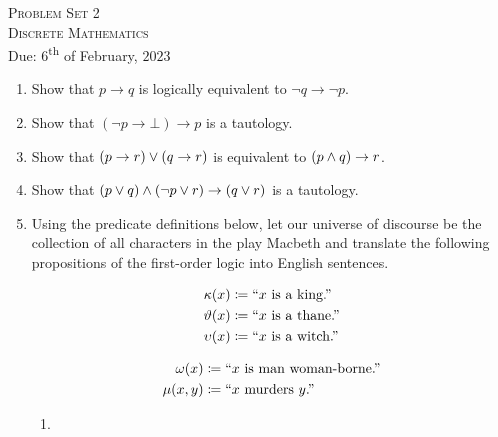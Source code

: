 




\begin{center}
    \textsc{\huge Problem Set 2}\\
    \textsc{\large Discrete Mathematics}\\
    {\color{gruvred}Due: \(6\)\textsuperscript{th} of February, \(2023\)}
\end{center}

\begin{enumerate}
    \item
        Show that \(p \rightarrow q\) is logically equivalent to \(\neg q \rightarrow \neg p\).
    \item
        Show that \((\neg p \rightarrow \bot)  \rightarrow p\) is a tautology.
    \item
        Show that \((p \rightarrow r) \vee (q \rightarrow r)\) is equivalent to \((p \wedge q) \rightarrow r\).
    \item
        Show that \((p \vee q) \wedge (\neg p \vee r) \rightarrow (q \vee r)\) is a tautology.
    \item
        Using the predicate definitions below,
        let our universe of discourse be the collection of all characters in the play Macbeth
        and translate the following propositions of the first-order logic into English sentences.\\
        \begin{minipage}{.5\linewidth}
            \begin{align*}
                \kappa(x) &\coloneqq \text{``}x\text{ is a king.''}\\
                \vartheta(x) &\coloneqq \text{``}x\text{ is a thane.''}\\
                \upsilon(x) &\coloneqq \text{``}x\text{ is a witch.''}
            \end{align*}
        \end{minipage}%
        \begin{minipage}{.5\linewidth}
            \begin{align*}
                \omega(x) &\coloneqq \text{``}x\text{ is man woman-borne.''}\\
                \mu(x, y) &\coloneqq \text{``}x\text{ murders }y\text{.''}
            \end{align*}
        \end{minipage}
        \begin{enumerate}
            \item

\end{enumerate}
\end{enumerate}
